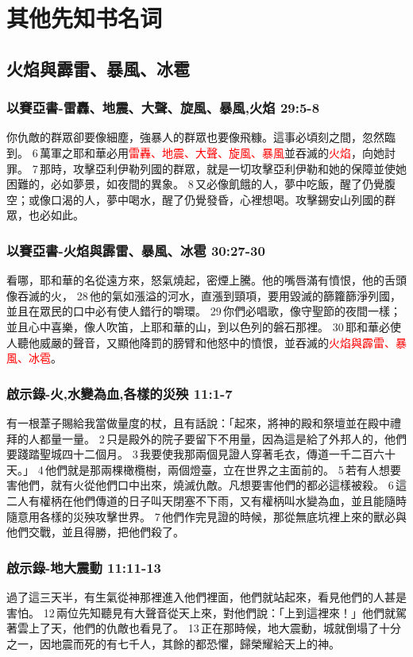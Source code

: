 \section{其他先知书名词}
\subsection{火焰與霹雷、暴風、冰雹}
\subsubsection{以賽亞書-雷轟、地震、大聲、旋風、暴風,火焰 29:5-8}
你仇敵的群眾卻要像細塵，強暴人的群眾也要像飛糠。這事必頃刻之間，忽然臨到。 6 萬軍之耶和華必用\textcolor{red}{雷轟、地震、大聲、旋風、暴風}並吞滅的\textcolor{red}{火焰}，向她討罪。 7 那時，攻擊亞利伊勒列國的群眾，就是一切攻擊亞利伊勒和她的保障並使她困難的，必如夢景，如夜間的異象。 8 又必像飢餓的人，夢中吃飯，醒了仍覺腹空；或像口渴的人，夢中喝水，醒了仍覺發昏，心裡想喝。攻擊錫安山列國的群眾，也必如此。

\subsubsection{以賽亞書-火焰與霹雷、暴風、冰雹 30:27-30}
看哪，耶和華的名從遠方來，怒氣燒起，密煙上騰。他的嘴唇滿有憤恨，他的舌頭像吞滅的火， 28 他的氣如漲溢的河水，直漲到頸項，要用毀滅的篩籮篩淨列國，並且在眾民的口中必有使人錯行的嚼環。 29 你們必唱歌，像守聖節的夜間一樣；並且心中喜樂，像人吹笛，上耶和華的山，到以色列的磐石那裡。 30 耶和華必使人聽他威嚴的聲音，又顯他降罰的膀臂和他怒中的憤恨，並吞滅的\textcolor{red}{火焰與霹雷、暴風、冰雹}。

\subsubsection{啟示錄-火,水變為血,各樣的災殃 11:1-7}
有一根葦子賜給我當做量度的杖，且有話說：「起來，將神的殿和祭壇並在殿中禮拜的人都量一量。 2 只是殿外的院子要留下不用量，因為這是給了外邦人的，他們要踐踏聖城四十二個月。 3 我要使我那兩個見證人穿著毛衣，傳道一千二百六十天。」 4 他們就是那兩棵橄欖樹，兩個燈臺，立在世界之主面前的。 5 若有人想要害他們，就有火從他們口中出來，燒滅仇敵。凡想要害他們的都必這樣被殺。 6 這二人有權柄在他們傳道的日子叫天閉塞不下雨，又有權柄叫水變為血，並且能隨時隨意用各樣的災殃攻擊世界。 7 他們作完見證的時候，那從無底坑裡上來的獸必與他們交戰，並且得勝，把他們殺了。


\subsubsection{啟示錄-地大震動 11:11-13}
過了這三天半，有生氣從神那裡進入他們裡面，他們就站起來，看見他們的人甚是害怕。 12 兩位先知聽見有大聲音從天上來，對他們說：「上到這裡來！」他們就駕著雲上了天，他們的仇敵也看見了。 13 正在那時候，地大震動，城就倒塌了十分之一，因地震而死的有七千人，其餘的都恐懼，歸榮耀給天上的神。

